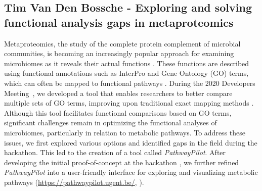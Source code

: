 \subsection{Tim Van Den Bossche - Exploring and solving functional analysis gaps in metaproteomics}

Metaproteomics, the study of the complete protein complement of microbial communities, is becoming an increasingly popular approach for examining microbiomes as it reveals their actual functions \citep{VanDenBossche2021}. These functions are described using functional annotations such as InterPro and Gene Ontology (GO) terms, which can often be mapped to functional pathways \citep{Schiebenhoefer2019}. During the 2020 Developers Meeting~\citep{EuBIC-MS2020}, we developed a tool that enables researchers to better compare multiple sets of GO terms, improving upon traditional exact mapping methods \citep{Verschaffelt2021}. Although this tool facilitates functional comparisons based on GO terms, significant challenges remain in optimizing the functional analyses of microbiomes, particularly in relation to metabolic pathways. To address these issues, we first explored various options and identified gaps in the field during the hackathon. This led to the creation of a tool called \emph{PathwayPilot}. After developing the initial proof-of-concept at the hackathon \citep{issue7}, we further refined \emph{PathwayPilot} into a user-friendly interface for exploring and visualizing metabolic pathways (\url{https://pathwaypilot.ugent.be/}, \citep{Tim2024}).

